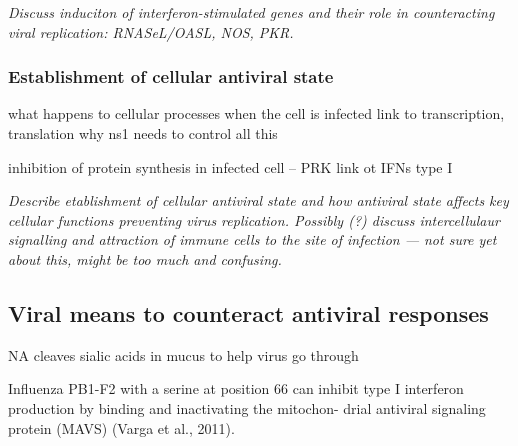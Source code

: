 		\textit{Discuss induciton of interferon-stimulated genes and their role in counteracting viral replication: RNASeL/OASL, NOS, PKR.}
		
		
		\subsubsection{Establishment of cellular antiviral state}
		
		what happens to cellular processes when the cell is infected
		link to transcription, translation 
		why ns1 needs to control all this
		
	
		inhibition of protein synthesis in infected cell -- PRK link ot IFNs type I
		
		\textit{Describe etablishment of cellular antiviral state and how antiviral state affects key cellular functions preventing virus replication. Possibly (?) discuss intercellulaur signalling and attraction of immune cells to the site of infection --- not sure yet about this, might be too much and confusing.}
		
	\subsection{Viral means to counteract antiviral responses}
	
	NA cleaves sialic acids in mucus to help virus go through
	
	Influenza PB1-F2 with a serine at position 66 can inhibit type
	I interferon production by binding and inactivating the mitochon- drial antiviral signaling protein (MAVS) (Varga et al., 2011).
	
